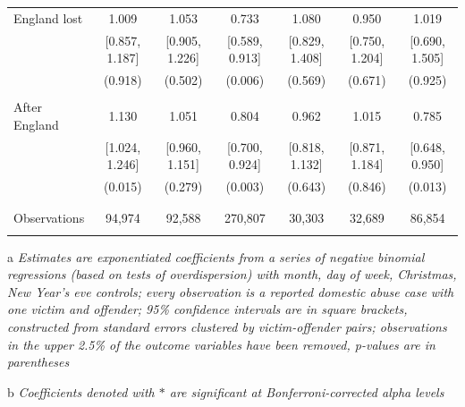 \documentclass[12pt, a4paper]{article}
\begin{document}
\begin{table}
{\begin{threeparttable}
\begin{tabular}{@{\extracolsep{5pt}}lcccccc}
 England lost & 1.009 & 1.053 & 0.733 & 1.080 & 0.950 & 1.019 \\
  & [0.857, 1.187] & [0.905, 1.226] & [0.589, 0.913] & [0.829, 1.408] & [0.750, 1.204] & [0.690, 1.505] \\
  & (0.918) & (0.502) & (0.006) & (0.569) & (0.671) & (0.925) \\
  & & & & & & \\
 After England & 1.130 & 1.051 & 0.804 & 0.962 & 1.015 & 0.785 \\
  & [1.024, 1.246] & [0.960, 1.151] & [0.700, 0.924] & [0.818, 1.132] & [0.871, 1.184] & [0.648, 0.950] \\
  & (0.015) & (0.279) & (0.003) & (0.643) & (0.846) & (0.013) \\
  & & & & & & \\
\hline \\[-1.8ex]
Observations & 94,974 & 92,588 & 270,807 & 30,303 & 32,689 & 86,854  \\
\hline \\[-1.8ex]
\end{tabular}
\begin{tablenotes}
      \item[a] \textit{Estimates are exponentiated coefficients from a series of negative binomial regressions (based on tests of overdispersion) with month, day of week, Christmas, New Year's eve controls; every observation is a reported domestic abuse case with one victim and offender; 95\% confidence intervals are in square brackets, constructed from standard errors clustered by victim-offender pairs; observations in the upper 2.5\% of the outcome variables have been removed, p-values are in parentheses}
          \item[b] \textit{Coefficients denoted with $*$ are significant at Bonferroni-corrected alpha levels}
    \end{tablenotes}
\end{threeparttable}   }
\end{table}
\end{document}
